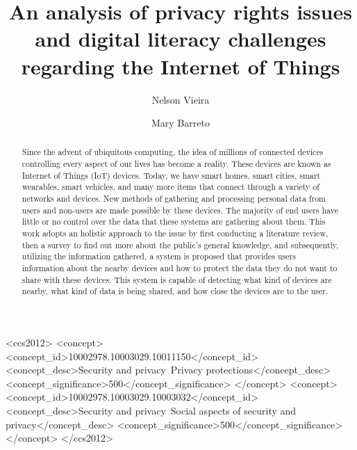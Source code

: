 \documentclass[manuscript,screen,review,natbib=false]{acmart}
\begin{document}
\title[Privacy rights and digital literacy challenges in the Internet of Things]{An analysis of privacy rights issues and digital literacy challenges regarding the Internet of Things}

\author{Nelson Vieira}

\author{Mary Barreto}

\renewcommand{\shortauthors}{Vieira and Barreto}

\begin{abstract}
    Since the advent of ubiquitous computing, the idea of millions of connected
    devices controlling every aspect of our lives has become a reality. These
    devices are known as Internet of Things (IoT) devices. Today, we have smart
    homes, smart cities, smart wearables, smart vehicles, and many more items
    that connect through a variety of networks and devices. New methods of
    gathering and processing personal data from users and non-users are
    made possible by these devices. The majority of end users have little
    or no control over the data that these systems are gathering about them.
    This work adopts an holistic approach to the issue by first conducting a
    literature review, then a survey to find out more about the public's
    general knowledge, and subsequently, utilizing the information gathered,
    a system is proposed that provides users information about the nearby
    devices and how to protect the data they do not want to share with these
    devices. This system is capable of detecting what kind of devices are
    nearby, what kind of data is being shared, and how close the devices
    are to the user.
    \end{abstract}

\begin{CCSXML}
    <ccs2012>
        <concept>
            <concept_id>10002978.10003029.10011150</concept_id>
            <concept_desc>Security and privacy~Privacy protections</concept_desc>
            <concept_significance>500</concept_significance>
        </concept>
        <concept>
            <concept_id>10002978.10003029.10003032</concept_id>
            <concept_desc>Security and privacy~Social aspects of security and privacy</concept_desc>
            <concept_significance>500</concept_significance>
        </concept>
    </ccs2012>
\end{CCSXML}
\end{document}
